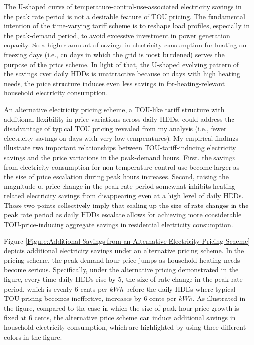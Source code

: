 The U-shaped curve of temperature-control-use-associated electricity savings in the peak rate period is not a desirable feature of TOU pricing. The fundamental intention of the time-varying tariff scheme is to reshape load profiles, especially in the peak-demand period, to avoid excessive investment in power generation capacity. So a higher amount of savings in electricity consumption for heating on freezing days (i.e., on days in which the grid is most burdened) serves the purpose of the price scheme. In light of that, the U-shaped evolving pattern of the savings over daily HDDs is unattractive because on days with high heating needs, the price structure induces even less savings in for-heating-relevant household electricity consumption. 

An alternative electricity pricing scheme, a TOU-like tariff structure with additional flexibility in price variations across daily HDDs, could address the disadvantage of typical TOU pricing revealed from my analysis (i.e., fewer electricity savings on days with very low temperatures). My empirical findings illustrate two important relationships between TOU-tariff-inducing electricity savings and the price variations in the peak-demand hours. First, the savings from electricity consumption for non-temperature-control use become larger as the size of price escalation during peak hours increases. Second, raising the magnitude of price change in the peak rate period somewhat inhibits heating-related electricity savings from disappearing even at a high level of daily HDDs. Those two points collectively imply that scaling up the size of rate changes in the peak rate period as daily HDDs escalate allows for achieving more considerable TOU-price-inducing aggregate savings in residential electricity consumption.  
 
Figure \ref{Figure:Additional-Savings-from-an-Alternative-Electricity-Pricing-Scheme} depicts additional electricity savings under an alternative pricing scheme. In the pricing scheme, the peak-demand-hour price jumps as household heating needs become serious. Specifically, under the alternative pricing demonstrated in the figure, every time daily HDDs rise by 5, the size of rate change in the peak rate period, which is evenly 6 cents per $kWh$ before the daily HDDs where typical TOU pricing becomes ineffective, increases by 6 cents per $kWh$. As illustrated in the figure, compared to the case in which the size of peak-hour price growth is fixed at 6 cents, the alternative price scheme can induce additional savings in household electricity consumption, which are highlighted by using three different colors in the figure.
